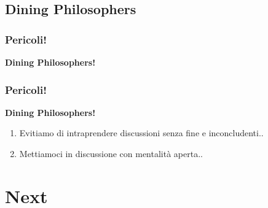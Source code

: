 \documentclass{beamer}
\begin{document}
\subsection{Dining Philosophers}
\begin{frame}
	\frametitle{Pericoli!}
	\begin{center}
		\textbf{Dining Philosophers!}
	\end{center}
	\begin{center}
	\end{center}
\end{frame}

\begin{frame}
	\frametitle{Pericoli!}
	\begin{center}
		\textbf{Dining Philosophers!}
	\end{center}
	\begin{enumerate}
  		\item<1-> Evitiamo di intraprendere discussioni senza fine e inconcludenti..
  		\item<2-> Mettiamoci in discussione con mentalità aperta..
	\end{enumerate}
\end{frame}

\section{Next}
\end{document}
